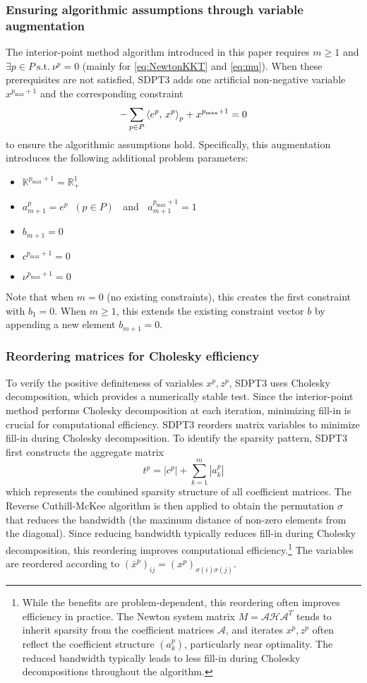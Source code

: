 \subsubsection{Ensuring algorithmic assumptions through variable augmentation}
The interior-point method algorithm introduced in this paper requires $m \geq 1$ and $\exists p\in P ~ \text{s.t.} ~ \nu^p=0$ (mainly for \eqref{eq:NewtonKKT} and \eqref{eq:mu}).
When these prerequisites are not satisfied, SDPT3 adds one artificial non-negative variable $x^{p_{\max} + 1}$ and the corresponding constraint
\[
  -\sum_{p\in P} \left\langle e^p, \, x^p \right\rangle_p + x^{p_{\max} + 1} = 0
\]
to ensure the algorithmic assumptions hold.
Specifically, this augmentation introduces the following additional problem parameters:
\begin{itemize}
    \item $\mathbb{K}^{p_{\max} + 1} = \mathbb{R}^1_+$
    \item $a^{p}_{m+1}=e^p \;\; (p \in P) \;\;$ and $\;\; a^{p_{\max} + 1}_{m+1} = 1$
    \item $b_{m+1} = 0$
    \item $c^{p_{\max} +1}=0$
    \item $\nu^{p_{\max} + 1} = 0$
\end{itemize}
Note that when $m = 0$ (no existing constraints), this creates the first constraint with $b_1 = 0$. When $m \geq 1$, this extends the existing constraint vector $b$ by appending a new element $b_{m+1} = 0$.


\subsubsection{Reordering matrices for Cholesky efficiency}
To verify the positive definiteness of variables $x^p, z^p$, SDPT3 uses Cholesky decomposition, which provides a numerically stable test.
Since the interior-point method performs Cholesky decomposition at each iteration, minimizing fill-in is crucial for computational efficiency.
SDPT3 reorders matrix variables to minimize fill-in during Cholesky decomposition.
To identify the sparsity pattern, SDPT3 first constructs the aggregate matrix
\[
  t^p = |c^p| + \sum_{k=1}^m |a^p_k|
\]
which represents the combined sparsity structure of all coefficient matrices.
The Reverse Cuthill-McKee algorithm \cite{Cuthill1969,Golub2013} is then applied to obtain the permutation $\sigma$ that reduces the bandwidth (the maximum distance of non-zero elements from the diagonal).
Since reducing bandwidth typically reduces fill-in during Cholesky decomposition, this reordering improves computational efficiency.\footnote{
  While the benefits are problem-dependent, this reordering often improves efficiency in practice. 
  The Newton system matrix $M = \mathcal{A}\mathcal{H}\mathcal{A}^T$ tends to inherit sparsity from the coefficient matrices $\mathcal{A}$, and iterates $x^p, z^p$ often reflect the coefficient structure $(a_k^p)$, particularly near optimality. 
  The reduced bandwidth typically leads to less fill-in during Cholesky decompositions throughout the algorithm.}
The variables are reordered according to $(\bar{x}^p)_{ij} = (x^p)_{\sigma(i)\sigma(j)}$.

